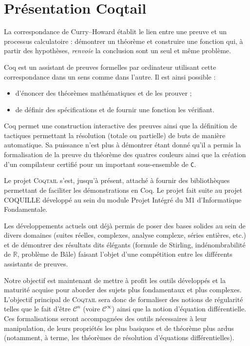\documentclass[11pt]{article}
\newcommand{\coqtail}{\textsc{Coqtail}}
\begin{document}
\section{Présentation Coqtail}


La correspondance de Curry--Howard établit le lien entre une preuve et un processus calculatoire : démontrer un théorème et construire une fonction qui, à partir des hypothèses, \emph{renvoie} la conclusion sont un seul et même problème.

Coq\cite{L:BC04} est un assistant de preuves formelles par ordinateur utilisant cette correspondance dans un sens comme dans l'autre. Il est ainsi possible :
\begin{itemize}
  \item d'énoncer des théorèmes mathématiques et de les prouver ;
  \item de définir des spécifications et de fournir une fonction les vérifiant.
\end{itemize}

Coq permet une construction interactive des preuves ainsi que la définition de tactiques permettant la résolution (totale ou partielle) de buts de manière automatique. Sa puissance n'est plus à démontrer étant donné qu'il a permis la formalisation de la preuve du théorème des quatres couleurs\cite{Gonthier07} ainsi que la création d'un compilateur certifié pour un important sous-ensemble de \texttt{C}\cite{compcert}.

Le projet \coqtail{} s'est, jusqu'à présent, attaché à fournir des bibliothèques permettant de faciliter les démonstrations en Coq. Le projet fait suite au projet COQUILLE développé au sein du module Projet Intégré du M1 d'Informatique Fondamentale.

Les développements actuels ont déjà permis de poser des bases solides au sein de divers domaines (suites réelles, complexes, analyse complexe, séries entières, etc.) et de démontrer des résultats dits élégants (formule de Stirling, indénombrabilité de $\mathbb{R}$, problème de Bâle) faisant l'objet d'une compétition entre les différents assistants de preuves\cite{Freek}.


Notre objectif est maintenant de mettre à profit les outils développés et la maturité acquise pour aborder des sujets plus fondamentaux et plus complexes. L'objectif principal de \coqtail{} sera donc de formaliser des notions de régularité telles que le fait d'être $\mathcal{C}^n$ (voire $\mathcal{C}^\infty$) ainsi que la notion d'équation différentielle. Ces formalisations seront accompagnées des outils nécessaires à leur manipulation, de leurs propriétés les plus basiques et de théorème plus ardus (notamment, à terme, les théorèmes de résolution d'équations différentielles).
\end{document}
